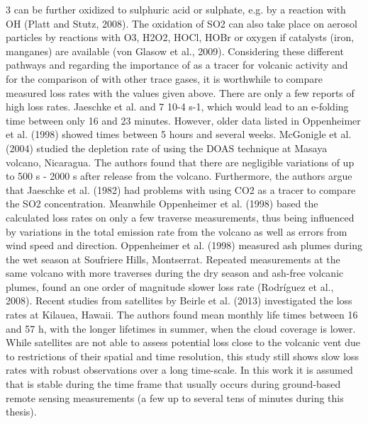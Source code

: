 \documentclass  [
  paper    = a4,
  BCOR     = 10mm,
  twoside,
  fontsize = 12pt,
  fleqn,
  toc      = bibnumbered,
  toc      = listofnumbered,
  numbers  = noendperiod,
  headings = normal,
  listof   = leveldown,
  version  = 3.03
]                                       {scrreprt}
\begin{document}
{%
	3 can be further oxidized to sulphuric acid or sulphate, e.g. by a
	reaction with OH (Platt and Stutz, 2008). The oxidation of SO2 can also take
	place on aerosol particles by reactions with O3, H2O2, HOCl, HOBr or oxygen if
	catalysts (iron, manganes) are available (von Glasow et al., 2009).
	Considering these different pathways and regarding the importance of  as
	a tracer for volcanic activity and for the comparison of  with other trace
	gases, it is worthwhile to compare measured  loss rates with the values given
	above. There are only a few reports of high  loss rates. Jaeschke et al.
	and 7  10-4 s-1, which would lead to an e-folding time between only 16 and
	23 minutes. However, older data listed in Oppenheimer et al. (1998) showed
	times between 5 hours and several weeks. McGonigle et al. (2004) studied the
	depletion rate of  using the DOAS technique at Masaya volcano, Nicaragua.
	The authors found that there are negligible variations of up to 500 s - 2000 s
	after release from the volcano. Furthermore, the authors argue that Jaeschke
	et al. (1982) had problems with using CO2 as a tracer to compare the SO2
	concentration. Meanwhile Oppenheimer et al. (1998) based the calculated loss
	rates on only a few traverse measurements, thus being influenced by variations
	in the total emission rate from the volcano as well as errors from wind speed and
	direction. Oppenheimer et al. (1998) measured ash plumes during the wet season
	at Soufriere Hills, Montserrat. Repeated measurements at the same volcano with
	more traverses during the dry season and ash-free volcanic plumes, found an one
	order of magnitude slower  loss rate (Rodríguez et al., 2008). Recent studies
	from satellites by Beirle et al. (2013) investigated the  loss rates at Kilauea,
	Hawaii. The authors found mean monthly  life times between 16 and 57 h,
	with the longer lifetimes in summer, when the cloud coverage is lower. While
	satellites are not able to assess potential  loss close to the volcanic vent due
	to restrictions of their spatial and time resolution, this study still shows slow
	 loss rates with robust observations over a long time-scale.
	In this work it is assumed that  is stable during the time frame that usually
	occurs during ground-based remote sensing measurements (a few up to several
	tens of minutes during this thesis).
}
\end{document}
